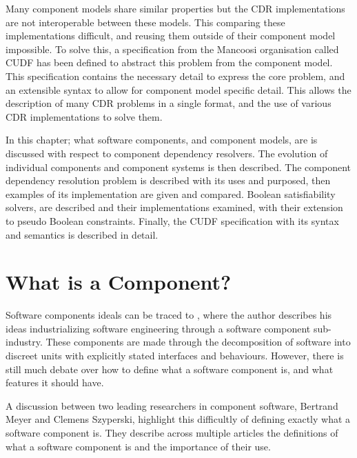 Many component models share similar properties but the CDR implementations are not interoperable between these models.
This comparing these implementations difficult, and reusing them outside of their component model impossible. 
To solve this, a specification from the Mancoosi organisation called CUDF has been defined to abstract this problem from the component model.
This specification contains the necessary detail to express the core problem, and an extensible syntax to allow for component model specific detail. 
This allows the description of many CDR problems in a single format, and the use of various CDR implementations to solve them. 

In this chapter; what software components, and component models, are is discussed with respect to component dependency resolvers.
The evolution of individual components and component systems is then described.
The component dependency resolution problem is described with its uses and purposed,
then examples of its implementation are given and compared.
Boolean satisfiability solvers, are described and their implementations examined, with their extension to pseudo Boolean constraints.
Finally, the CUDF specification with its syntax and semantics is described in detail.
 
\section{What is a Component?}
Software components ideals can be traced to \cite{McIlroy1969}, where the author describes his ideas industrializing software engineering through a software component sub-industry. 
These components are made through the decomposition of software into discreet units with explicitly stated interfaces and behaviours.
However, there is still much debate over how to define what a software component is, and what features it should have.

A discussion between two leading researchers in component software, Bertrand Meyer and Clemens Szyperski, highlight this difficultly of defining exactly what a software component is. 
They describe across multiple articles \cite{Meyer1999,Szyperski2000a, Szyperski2000, Meyer2000,} the definitions of what a software component is and the importance of their use.

